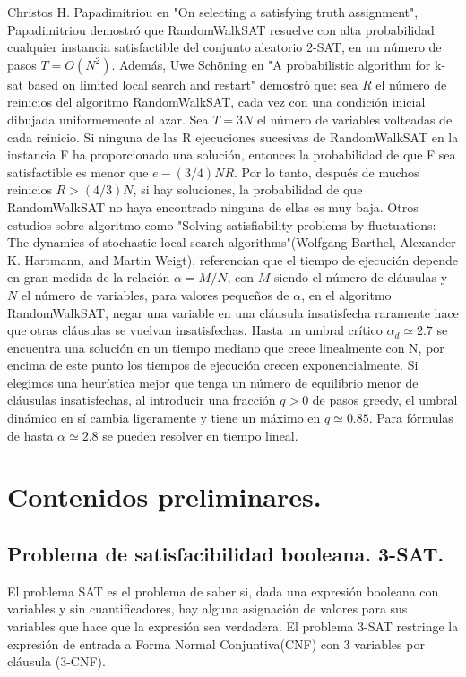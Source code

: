 \documentclass[article]{llncs}
\begin{document}
Christos H. Papadimitriou en "On selecting a satisfying truth assignment", Papadimitriou demostró que RandomWalkSAT 
resuelve con alta probabilidad cualquier instancia satisfactible del conjunto aleatorio 2-SAT, en un número de 
pasos $T = O(N^2)$. Además, Uwe Schöning en "A probabilistic algorithm for k-sat based on limited local
search and restart" demostró que: sea $R$ el número de reinicios del algoritmo RandomWalkSAT, cada vez con una condición 
inicial dibujada uniformemente al azar. Sea $T = 3N$ el número de variables volteadas de cada reinicio. Si ninguna de 
las R ejecuciones sucesivas de RandomWalkSAT en la instancia F ha proporcionado una solución, entonces la probabilidad 
de que F sea satisfactible es menor que $e − (3/4)NR$. Por lo tanto, después de muchos reinicios $R > (4/3)N$, si hay soluciones, 
la probabilidad de que RandomWalkSAT no haya encontrado ninguna de ellas es muy baja. Otros estudios sobre algoritmo como 
"Solving satisfiability problems by fluctuations: The dynamics of stochastic local search algorithms"(Wolfgang Barthel, 
Alexander K. Hartmann, and Martin Weigt), referencian que el tiempo de ejecución depende en gran medida de la relación 
$\alpha = M/N$, con $M$ siendo el número de cláusulas y $N$ el número de variables, para valores pequeños de $\alpha $, en el  
algoritmo RandomWalkSAT, negar una variable en una cláusula insatisfecha raramente hace que otras cláusulas se vuelvan insatisfechas. 
Hasta un umbral crítico $\alpha_d \simeq  2.7$ se encuentra una solución en un tiempo mediano que crece linealmente con N, por encima de este 
punto los tiempos de ejecución crecen exponencialmente. Si elegimos una heurística mejor que tenga un número de equilibrio menor de cláusulas insatisfechas, 
al introducir una fracción $q > 0$ de pasos greedy, el umbral dinámico en sí cambia ligeramente y tiene un máximo en $q \simeq  0.85$. Para fórmulas de hasta 
$\alpha  \simeq  2.8$ se pueden resolver en tiempo lineal.


\section{Contenidos preliminares.}

\subsection{Problema de satisfacibilidad booleana. 3-SAT.}

El problema SAT es el problema de saber si, dada una expresión booleana con variables y sin cuantificadores, 
hay alguna asignación de valores para sus variables que hace que la expresión sea verdadera. El problema 3-SAT restringe 
la expresión de entrada a Forma Normal Conjuntiva(CNF) con 3 variables por cláusula (3-CNF).
\end{document}
